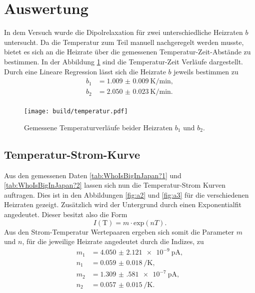 \section{Auswertung}

In dem Versuch wurde die Dipolrelaxation für zwei unterschiedliche Heizraten $b$ untersucht. Da die Temperatur zum Teil manuell nachgeregelt werden musste, bietet es sich an die Heizrate über
die gemessenen Temperatur-Zeit-Abstände zu bestimmen. In der Abbildung \ref{fig:a1} sind die Temperatur-Zeit Verläufe dargestellt. Durch eine Lineare Regression lässt sich die Heizrate $b$ jeweils bestimmen zu
\begin{align*}
    b_1 &= \SI{1.009(9)}{\kelvin\per\minute},\\
    b_2 &= \SI{2.050(23)}{\kelvin\per\minute}.\\
\end{align*}
\begin{figure}
    \centering
    \texttt{[image: build/temperatur.pdf]}
    \caption{Gemessene Temperaturverläufe beider Heizraten $b_1$ und $b_2$.
            }
    \label{fig:a1}
\end{figure}
\subsection{Temperatur-Strom-Kurve}

Aus den gemessenen Daten \ref{tab:WhoIsBigInJapan?1} und \ref{tab:WhoIsBigInJapan?2} lassen sich nun die Temperatur-Strom Kurven auftragen. Dies ist in den Abbildungen \ref{fig:a2} und \ref{fig:a3} für die verschiedenen Heizraten gezeigt. Zusätzlich wird der Untergrund durch einen Exponentialfit angedeutet. 
Dieser besitzt also die Form
\begin{equation*}
I(\text{T}) = m \cdot \text{exp} \left(nT\right).
\end{equation*}
Aus den Strom-Temperatur Wertepaaren ergeben sich somit die Parameter $m$ und $n$, für die jeweilige Heizrate angedeutet durch die Indizes, zu
\begin{align*}
m_1 &= \SI{4.050(2121)e-9}{\pico\ampere},\\  
n_1 &= \SI{0.059(18)}{\per\kelvin},\\ 
m_2 &= \SI{1.309(581)e-7}{\pico\ampere},\\ 
n_2 &= \SI{0.057(15)}{\per\kelvin}.\\ 
\end{align*}

